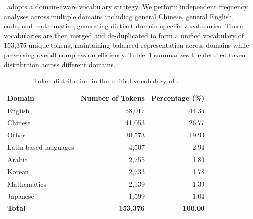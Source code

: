\modelname~adopts a domain-aware vocabulary strategy. We perform independent frequency analyses across multiple domains including general Chinese, general English, code, and mathematics, generating distinct domain-specific vocabularies. These vocabularies are then merged and de-duplicated to form a unified vocabulary of 153,376 unique tokens, maintaining balanced representation across domains while preserving overall compression efficiency. Table~\ref{tab:vocab_distribution} summarizes the detailed token distribution across different domains.
\begin{table}[htbp]
\centering
\caption{Token distribution in the unified vocabulary of \modelname.}
\label{tab:vocab_distribution}
\small
\begin{tabular}{lrr}
\toprule
\textbf{Domain} & \textbf{Number of Tokens} & \textbf{Percentage (\%)} \\
\midrule
English & 68,017 & 44.35 \\
Chinese & 41,053 & 26.77 \\
Other & 30,573 & 19.93 \\
Latin-based languages & 4,507 & 2.94 \\
Arabic & 2,755 & 1.80 \\
Korean & 2,733 & 1.78 \\
Mathematics & 2,139 & 1.39 \\
Japanese & 1,599 & 1.04 \\

\midrule
\textbf{Total} & \textbf{153,376} & \textbf{100.00} \\
\bottomrule
\end{tabular}
\end{table}
